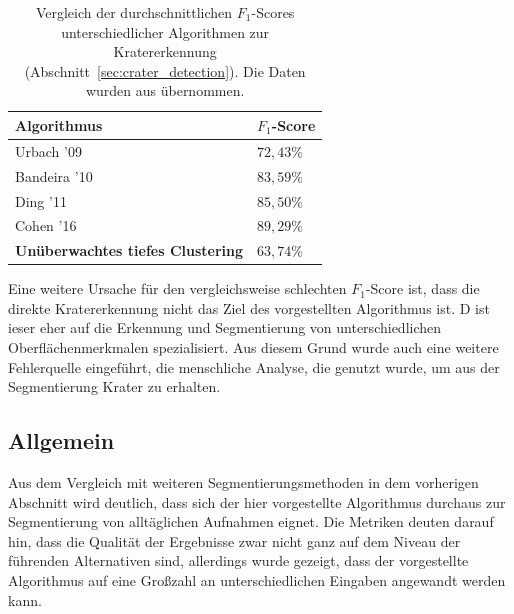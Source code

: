 \begin{table}[H]
	\begin{tabularx}{\textwidth}{p{} >{\centering\arraybackslash}p{}}
		\toprule
		\textbf{Algorithmus} & \textbf{$F_1$-Score} \\
		\midrule
		Urbach '09 \cite{urbach_stepinski_2009} & $72,43\%$ \\
		Bandeira '10 \cite{bandeira_10} & $83,59\%$ \\
		Ding '11 \cite{ding_11} & $85,50\%$ \\
		Cohen '16 \cite{cohen_16} & $89,29\%$ \\
		\textbf{Unüberwachtes tiefes Clustering} & $63,74\%$\\
		\bottomrule
	\end{tabularx}
	\caption{Vergleich der durchschnittlichen $F_1$-Scores unterschiedlicher Algorithmen zur Kratererkennung (\vgl Abschnitt~\ref{sec:crater_detection}). Die Daten wurden aus \cite{cohen_16} übernommen.}
	\label{tab:f1_comparision}
\end{table}

Eine weitere Ursache für den vergleichsweise schlechten $F_1$-Score ist, dass die direkte Kratererkennung nicht das Ziel des vorgestellten Algorithmus ist. D ist ieser eher auf die Erkennung und Segmentierung von unterschiedlichen Oberflächenmerkmalen spezialisiert. Aus diesem Grund wurde auch eine weitere Fehlerquelle eingeführt, die menschliche Analyse, die genutzt wurde, um aus der Segmentierung Krater zu erhalten.

\subsection{Allgemein}
Aus dem Vergleich mit weiteren Segmentierungsmethoden in dem vorherigen Abschnitt wird deutlich, dass sich der hier vorgestellte Algorithmus durchaus zur Segmentierung von alltäglichen Aufnahmen eignet. Die Metriken deuten darauf hin, dass die Qualität der Ergebnisse zwar nicht ganz auf dem Niveau der führenden Alternativen sind, allerdings wurde gezeigt, dass der vorgestellte Algorithmus auf eine Großzahl an unterschiedlichen Eingaben angewandt werden kann.


